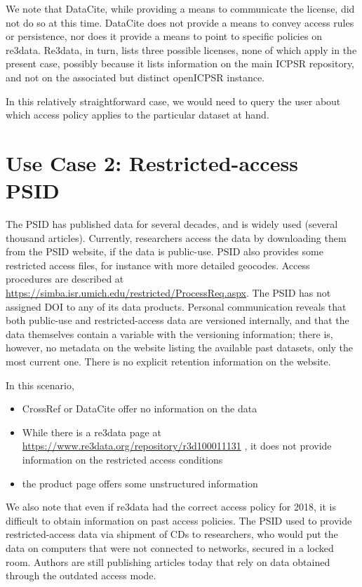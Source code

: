 We note that DataCite, while providing a means to communicate the license, did not do so at this time. DataCite does not provide a means to convey access rules or persistence, nor does it provide a means to point to specific policies on re3data. Re3data, in turn, lists three possible licenses, none of which apply in the present case, possibly because it lists information on the main ICPSR repository, and not on the associated but distinct openICPSR instance.

In this relatively straightforward case, we would need to query the user  about  which access policy applies to the particular dataset at hand. 

\section{Use Case 2: Restricted-access PSID}
The \ac{PSID} has published data for several decades, and is widely used (several thousand articles). Currently, researchers access the data by downloading them from the \ac{PSID} website, if the data is public-use. \ac{PSID} also provides some restricted access files, for instance with more detailed geocodes. Access procedures are described at \url{https://simba.isr.umich.edu/restricted/ProcessReq.aspx}. The \ac{PSID} has not assigned \ac{DOI} to any of its data products. Personal communication reveals that both public-use and restricted-access data are versioned internally, and that the data themselves contain a variable with the versioning information; there is, however, no metadata on the website listing the available past datasets, only the most current one. There is no explicit retention information on the website.

In this scenario, 
\begin{itemize}
	\item CrossRef or DataCite offer no information on the data
	\item While there is a re3data page at \url{https://www.re3data.org/repository/r3d100011131} \parencite{Re3data-psid}, it does not provide information on the restricted access conditions
	\item the product page offers some unstructured information
\end{itemize}
We also note that even if re3data had the correct access policy for 2018, it is difficult to obtain information on past access policies. The \ac{PSID} used to provide restricted-access data via shipment of CDs to researchers, who would put the data on computers that were not connected to networks, secured in a locked room. Authors are still publishing articles today that rely on data obtained through the outdated access mode. 

